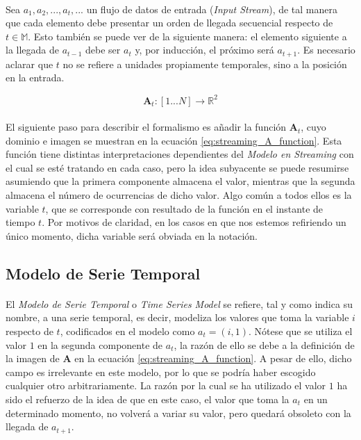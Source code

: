 \documentclass{subfiles}
\begin{document}
        \paragraph{}
        Sea $a_1 ,a_2 ,... ,a_t,... $ un flujo de datos de entrada (\emph{Input Stream}), de tal manera que cada elemento debe presentar un orden de llegada secuencial respecto de $t \in \mathbb{M}$. Esto también se puede ver de la siguiente manera: el elemento siguiente a la llegada de $a_{t-1}$ debe ser $a_{t}$ y, por inducción, el próximo será $a_{t+1}$. Es necesario aclarar que $t$ no se refiere a unidades propiamente temporales, sino a la posición en la entrada.


        \begin{equation}
        \label{eq:streaming_A_function}
          \boldsymbol{A}_t:[1...N] \rightarrow \mathbb{R}^2
        \end{equation}


        \paragraph{}
        El siguiente paso para describir el formalismo es añadir la función $\boldsymbol{A}_t$, cuyo dominio e imagen se muestran en la ecuación \eqref{eq:streaming_A_function}. Esta función tiene distintas interpretaciones dependientes del \emph{Modelo en Streaming} con el cual se esté tratando en cada caso, pero la idea subyacente se puede resumirse asumiendo que la primera componente almacena el valor, mientras que la segunda almacena el número de ocurrencias de dicho valor. Algo común a todos ellos es la variable $t$, que se corresponde con resultado de la función en el instante de tiempo $t$. Por motivos de claridad, en los casos en que nos estemos refiriendo un único momento, dicha variable será obviada en la notación.

      \subsection{Modelo de Serie Temporal}
      \label{sec:streaming_time_series}

        \paragraph{}
        El \emph{Modelo de Serie Temporal} o \emph{Time Series Model} se refiere, tal y como indica su nombre, a una serie temporal, es decir, modeliza los valores que toma la variable $i$ respecto de $t$, codificados en el modelo como $a_t = (i,1)$. Nótese que se utiliza el valor $1$ en la segunda componente de $a_t$, la razón de ello se debe a la definición de la imagen de $\boldsymbol{A}$ en la ecuación \eqref{eq:streaming_A_function}. A pesar de ello, dicho campo es irrelevante en este modelo, por lo que se podría haber escogido cualquier otro arbitrariamente. La razón por la cual se ha utilizado el valor $1$ ha sido el refuerzo de la idea de que en este caso, el valor que toma la $a_t$ en un determinado momento, no volverá a variar su valor, pero quedará obsoleto con la llegada de $a_{t+1}$.
\end{document}
